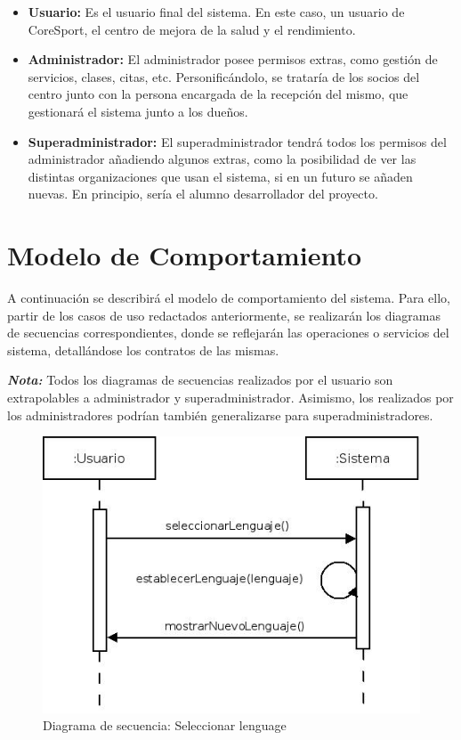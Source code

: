 \begin{itemize}
\item \textbf{Usuario:} Es el usuario final del sistema. En este caso, un usuario de CoreSport, el centro de mejora de la salud y el rendimiento.
\item \textbf{Administrador:} El administrador posee permisos extras, como gestión de servicios, clases, citas, etc. Personificándolo, se trataría de los socios del centro junto con la persona encargada de la recepción del mismo, que gestionará el sistema junto a los dueños.
\item \textbf{Superadministrador:} El superadministrador tendrá todos los permisos del administrador añadiendo algunos extras, como la posibilidad de ver las distintas organizaciones que usan el sistema, si en un futuro se añaden nuevas. En principio, sería el alumno desarrollador del proyecto.
\end {itemize}



\section{Modelo de Comportamiento}
A continuación se describirá el modelo de comportamiento del sistema. Para ello, partir de los casos de uso redactados anteriormente, se realizarán los diagramas de secuencias correspondientes, donde se reflejarán las operaciones o servicios del sistema, detallándose los contratos de las mismas.

\textbf{\textit{Nota:}} Todos los diagramas de secuencias realizados por el usuario son extrapolables a administrador y superadministrador. Asimismo, los realizados por los administradores podrían también generalizarse para superadministradores. 


\vspace{10mm} %

\begin{figure}[h!]
\centering
  \includegraphics[scale=.55]{img/secuencias/seleccionar-idioma.jpeg}
  \caption{Diagrama de secuencia: Seleccionar lenguage}
  \label{fig:secuencia-seleccionar-lenguaje}
\end{figure}


